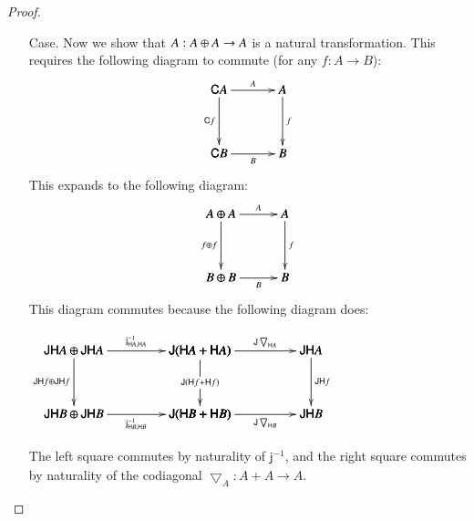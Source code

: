 \documentclass{lmcs}
\let\mto\to
\let\to\relax
\newcommand{\to}{\rightarrow}
\let\c\relax
\let\wn\relax
\newcommand{\func}[1]{\mathsf{#1}}
\newcommand{\c}[1]{\mathsf{c}_{#1}}
\newcommand{\jinv}[1]{\mathsf{j}^{-1}_{#1}}
\newcommand{\wn}[0]{\mathop{?}}
\newenvironment{diagram}{
  \begin{center}
    \begin{math}
      \bfig
}{
      \efig
    \end{math}
  \end{center}
}
\begin{document}
\begin{proof}
\begin{itemize}
\begin{itemize}
    \end{itemize}

  \item[Case.] Now we show that $\c{A} : \wn A \oplus \wn A \mto \wn
    A$ is a natural transformation.  This requires the following
    diagram to commute (for any $f : A \mto B$):
    \[
    \bfig
    \square[
      \func{C}A`
      \wn A`
      \func{C}B`
      \wn B;
      \c{A}`
      \func{C}f`
      \wn f`
      \c{B}]
    \efig
    \]
    This expands to the following diagram:
    \[
    \bfig
    \square[
      \wn A \oplus \wn A`
      \wn A`
      \wn B \oplus \wn B`
      \wn B;
      \c{A}`
      \wn f \oplus \wn f`
      \wn f`
      \c{B}]
    \efig
    \]
    This diagram commutes because the following diagram does:
    \begin{diagram}
      \hSquares[
        \func{JH}A \oplus \func{JH}A`
        \func{J}(\func{H}A + \func{H}A)`
        \func{JH}A`
        \func{JH}B \oplus \func{JH}B`
        \func{J}(\func{H}B + \func{H}B)`
        \func{JH}B;
        \jinv{\func{H}A, \func{H}A}`
        \func{J}\bigtriangledown_{\func{H}A}`
        \func{JH}f \oplus \func{JH}f`
        \func{J}(\func{H}f + \func{H}f)`
        \func{JH}f`
        \jinv{\func{H}B, \func{H}B}`
        \func{J}\bigtriangledown_{\func{H}B}]
    \end{diagram}
    The left square commutes by naturality of $\jinv{}$, and the right square commutes by naturality of the codiagonal
    $\bigtriangledown_{A} : A + A \mto A$.


\end{itemize}
\end{proof}
\end{document}
